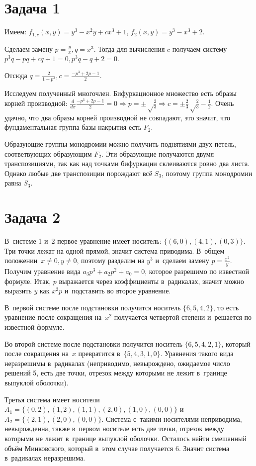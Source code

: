 \documentclass{article}
\begin{document}
\section{Задача 1}

Имеем: $f_{1,c}(x,y) = y^3 - x^2y + cx^3 + 1$, $f_2(x,y) = y^3 - x^3 + 2$.

Сделаем замену $p = \frac{y}{x}, q = x^3$. Тогда для вычисления $c$ получаем
систему $p^3q - pq + cq + 1 = 0, p^3q - q + 2 = 0$.

Отсюда $q = \frac{2}{1 - p^3}, c = \frac{-p^3 + 2p - 1}{2}$.

Исследуем полученный многочлен. Бифуркационное множество есть образы корней
производной: $\frac{d}{dx} \frac{-p^3+2p-1}{2} = 0 \Rightarrow p = \pm
\sqrt\frac{2}{3} \Rightarrow c = \pm \frac{2}{3}\sqrt\frac{2}{3} - \frac{1}{2}$.
Очень удачно, что два образы корней производной не совпадают, это значит, что
фундаментальная группа базы накрытия есть $F_2$.

Образующие группы монодромии можно получить поднятиями двух петель,
соответвующих образующим $F_2$. Эти образующие получаются двумя транспозициями,
так как над точками бифуркации склеиваются ровно два листа. Однако любые две
транспозиции порождают всё $S_3$, поэтому группа монодромии равна $S_3$.

\section{Задача 2}

В~системе 1 и~2 первое уравнение имеет носитель: $\{(6,0), (4,1), (0,3)\}$. Три
точки лежат на одной прямой, значит система приводима. В~общем положении~$x \ne
0, y \ne 0$, поэтому разделим на $y^3$ и~сделаем замену $p = \frac{x^2}{y}$.
Получим уравнение вида $a_3 p^3 + a_2 p^2 + a_0 = 0$, которое разрешимо по
известной формуле. Итак, $p$ выражается через коэффициенты в~радикалах, значит
можно выразить $y$ как $x^2 p$ и~подставить во второе уравнение.

В~первой системе после подстановки получится носитель $\{6, 5, 4, 2\}$, то есть
уравнение после сокращения на~$x^2$ получается четвертой степени и~решается по
известной формуле.

Во второй системе после подстановки получится носитель $\{6, 5, 4, 2, 1\}$,
который после сокращения на~$x$ превратится в~$\{5, 4, 3, 1, 0\}$. Уравнения
такого вида неразрешимы в~радикалах (неприводимо, невырождено, ожидаемое число
решений 5, есть две точки, отрезок между которыми не лежит в~границе выпуклой
оболочки).

Третья система имеет носители $A_1 = \{(0,2),(1,2),(1,1),(2,0),(1,0),(0,0)\}$ и
$A_2 = \{(2,1), (2,0), (0,0)\}$. Система с~такими носителями неприводима,
невырожденна, также в~первом носителе есть две точки, отрезок между которыми не
лежит в~границе выпуклой оболочки. Осталось найти смешанный объём Минковского,
который в~этом случае получается 6. Значит система в~радикалах неразрешима.
\end{document}
